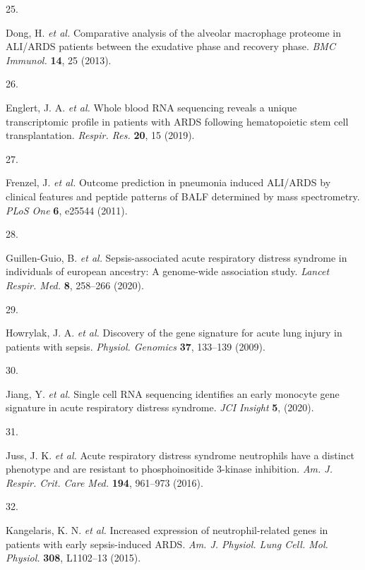 \documentclass[
  11,
  a4paper,
]{article}
\newlength{\cslhangindent}
\newlength{\csllabelwidth}
\newlength{\cslentryspacingunit} %
\newenvironment{CSLReferences}[2] %
 {%
  \setlength{\parindent}{0pt}
  \ifodd #1
  \let\oldpar\par
  \def\par{\hangindent=\cslhangindent\oldpar}
  \fi
  \setlength{\parskip}{#2\cslentryspacingunit}
 }%
 {}
\newcommand{\CSLLeftMargin}[1]{\parbox[t]{\csllabelwidth}{#1}}
\newcommand{\CSLRightInline}[1]{\parbox[t]{\linewidth - \csllabelwidth}{#1}\break}
\begin{document}
\begin{CSLReferences}{0}{0}
\leavevmode{}%
\CSLLeftMargin{25. }%
\CSLRightInline{Dong, H. \emph{et al.} Comparative analysis of the
alveolar macrophage proteome in {ALI/ARDS} patients between the
exudative phase and recovery phase. \emph{BMC Immunol.} \textbf{14}, 25
(2013).}

\leavevmode{}%
\CSLLeftMargin{26. }%
\CSLRightInline{Englert, J. A. \emph{et al.} Whole blood {RNA}
sequencing reveals a unique transcriptomic profile in patients with
{ARDS} following hematopoietic stem cell transplantation. \emph{Respir.
Res.} \textbf{20}, 15 (2019).}

\leavevmode{}%
\CSLLeftMargin{27. }%
\CSLRightInline{Frenzel, J. \emph{et al.} Outcome prediction in
pneumonia induced {ALI/ARDS} by clinical features and peptide patterns
of {BALF} determined by mass spectrometry. \emph{PLoS One} \textbf{6},
e25544 (2011).}

\leavevmode{}%
\CSLLeftMargin{28. }%
\CSLRightInline{Guillen-Guio, B. \emph{et al.} Sepsis-associated acute
respiratory distress syndrome in individuals of european ancestry: A
genome-wide association study. \emph{Lancet Respir. Med.} \textbf{8},
258--266 (2020).}

\leavevmode{}%
\CSLLeftMargin{29. }%
\CSLRightInline{Howrylak, J. A. \emph{et al.} Discovery of the gene
signature for acute lung injury in patients with sepsis. \emph{Physiol.
Genomics} \textbf{37}, 133--139 (2009).}

\leavevmode{}%
\CSLLeftMargin{30. }%
\CSLRightInline{Jiang, Y. \emph{et al.} Single cell {RNA} sequencing
identifies an early monocyte gene signature in acute respiratory
distress syndrome. \emph{JCI Insight} \textbf{5}, (2020).}

\leavevmode{}%
\CSLLeftMargin{31. }%
\CSLRightInline{Juss, J. K. \emph{et al.} Acute respiratory distress
syndrome neutrophils have a distinct phenotype and are resistant to
phosphoinositide 3-kinase inhibition. \emph{Am. J. Respir. Crit. Care
Med.} \textbf{194}, 961--973 (2016).}

\leavevmode{}%
\CSLLeftMargin{32. }%
\CSLRightInline{Kangelaris, K. N. \emph{et al.} Increased expression of
neutrophil-related genes in patients with early sepsis-induced {ARDS}.
\emph{Am. J. Physiol. Lung Cell. Mol. Physiol.} \textbf{308}, L1102--13
(2015).}


\end{CSLReferences}
\end{document}

